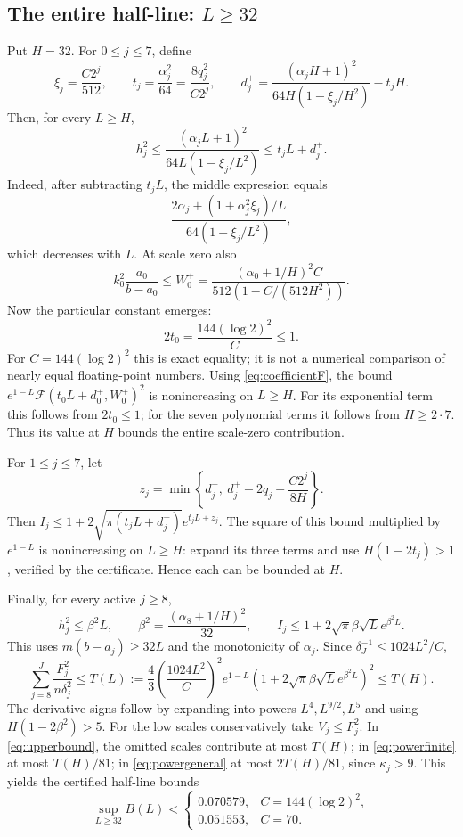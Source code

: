 \documentclass[10pt]{article}
\begin{document}
\subsection{The entire half-line: $L\ge32$}
Put $H=32$. For $0\le j\le7$, define
\[
 \xi_j=\frac{C2^j}{512},\qquad
 t_j=\frac{\alpha_j^2}{64}=\frac{8q_j^2}{C2^j},\qquad
 d_j^+=\frac{(\alpha_jH+1)^2}{64H(1-\xi_j/H^2)}-t_jH.
\]
Then, for every $L\ge H$,
\begin{equation}\label{eq:affine}
 h_j^2\le\frac{(\alpha_jL+1)^2}{64L(1-\xi_j/L^2)}
 \le t_jL+d_j^+.
\end{equation}
Indeed, after subtracting $t_jL$, the middle expression equals
\[
 \frac{2\alpha_j+(1+\alpha_j^2\xi_j)/L}
      {64(1-\xi_j/L^2)},
\]
which decreases with $L$. At scale zero also
\[
 k_0^2\frac{a_0}{b-a_0}\le
 W_0^+=\frac{(\alpha_0+1/H)^2 C}{512(1-C/(512H^2))}.
\]
Now the particular constant emerges:
\begin{equation}\label{eq:critical}
 2t_0=\frac{144(\log2)^2}{C}\le1.
\end{equation}
For $C=144(\log2)^2$ this is exact equality; it is not a numerical
comparison of nearly equal floating-point numbers.
Using \eqref{eq:coefficientF}, the bound
$e^{1-L}\mathcal F(t_0L+d_0^+,W_0^+)^2$ is nonincreasing on $L\ge H$.
For its exponential term this follows from $2t_0\le1$; for the seven
polynomial terms it follows from $H\ge2\cdot7$.
Thus its value at $H$ bounds the entire scale-zero contribution.

For $1\le j\le7$, let
\[
 z_j=\min\left\{d_j^+,\ d_j^+-2q_j+\frac{C2^j}{8H}\right\}.
\]
Then $I_j\le1+2\sqrt{\pi(t_jL+d_j^+)}e^{t_jL+z_j}$.
The square of this bound multiplied by $e^{1-L}$ is nonincreasing on
$L\ge H$: expand its three terms and use
$H(1-2t_j)>1$, verified by the certificate. Hence each can be bounded at $H$.

Finally, for every active $j\ge8$,
\[
 h_j^2\le\beta^2L,\qquad
 \beta^2=\frac{(\alpha_8+1/H)^2}{32},\qquad
 I_j\le1+2\sqrt\pi\beta\sqrt L e^{\beta^2L}.
\]
This uses $m(b-a_j)\ge32L$ and the monotonicity of $\alpha_j$.
Since $\delta_J^{-1}\le1024L^2/C$,
\begin{equation}\label{eq:tail}
 \sum_{j=8}^J\frac{F_j^2}{n\delta_j^2}
 \le T(L):=\frac43\left(\frac{1024L^2}{C}\right)^2
 e^{1-L}\left(1+2\sqrt\pi\beta\sqrt L e^{\beta^2L}\right)^2
 \le T(H).
\end{equation}
The derivative signs follow by expanding into powers $L^4,L^{9/2},L^5$
and using $H(1-2\beta^2)>5$.
For the low scales conservatively take $V_j\le F_j^2$.
In \eqref{eq:upperbound}, the omitted scales contribute at most $T(H)$;
in \eqref{eq:powerfinite} at most $T(H)/81$; in
\eqref{eq:powergeneral} at most $2T(H)/81$, since $\kappa_j>9$.
This yields the certified half-line bounds
\[
 \sup_{L\ge32}B(L)<
 \begin{cases}
 0.070579,&C=144(\log2)^2,\\
 0.051553,&C=70.
 \end{cases}
\]
\end{document}
